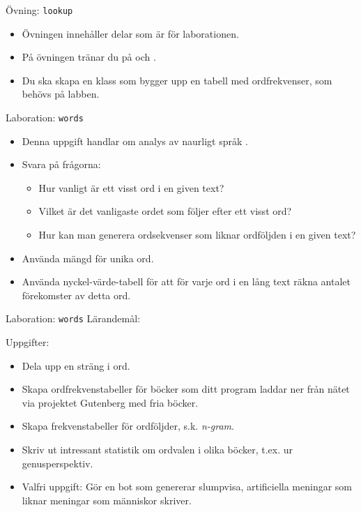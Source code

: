 


\begin{Slide}{Övning: \texttt{lookup}}
\begin{itemize}\SlideFontSmall
  \item Övningen innehåller delar som är  för laborationen.
  \item På övningen tränar du på  och .
  \item Du ska skapa en klass  som bygger upp en tabell med ordfrekvenser, som behövs på labben.
\end{itemize}
\end{Slide}

\begin{Slide}{Laboration: \texttt{words}}
\begin{itemize}
  \item Denna uppgift handlar om analys av naurligt språk .
  \item Svara på frågorna:
  \begin{itemize}%
  \item Hur vanligt är ett visst ord i en given text?
  \item Vilket är det vanligaste ordet som följer efter ett visst ord?
  \item Hur kan man generera ordsekvenser som liknar ordföljden i en given text?
  \end{itemize}
\item Använda mängd för unika ord.
\item Använda nyckel-värde-tabell för att för varje ord i en lång text räkna antalet förekomster av detta ord.
\end{itemize}
\end{Slide}


\begin{Slide}{Laboration: \texttt{words}}
Lärandemål:
\begin{itemize}\SlideFontSmall

\end{itemize}
Uppgifter:
\begin{itemize}\SlideFontSmall
  \item Dela upp en sträng i ord.
  \item Skapa ordfrekvenstabeller för böcker som ditt program laddar ner från nätet via projektet Gutenberg med fria böcker.
  \item Skapa frekvenstabeller för ordföljder, s.k. \emph{n-gram}.
  \item Skriv ut intressant statistik om ordvalen i olika böcker, t.ex. ur genusperspektiv.
  \item Valfri uppgift: Gör en bot som genererar slumpvisa, artificiella meningar som liknar meningar som människor skriver.
\end{itemize}
\end{Slide}
